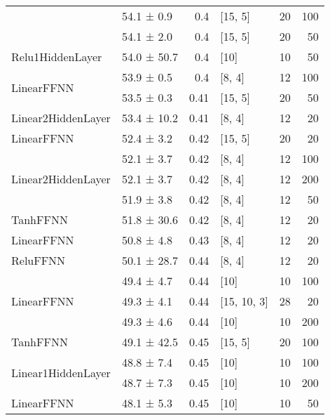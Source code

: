 \begin{table*}[h]
\begin{tabular}{llrlrr}
         & 54.1 ± 0.9  &  0.4  & [15, 5]        &         20 &      100 \\
         & 54.1 ± 2.0  &  0.4  & [15, 5]        &         20 &       50 \\
 \hline
Relu1HiddenLayer         & 54.0 ± 50.7 &  0.4  & [10]           &         10 &       50 \\
 \hline
\multirow{2}{*}{LinearFFNN}         & 53.9 ± 0.5  &  0.4  & [8, 4]         &         12 &      100 \\
         & 53.5 ± 0.3  &  0.41 & [15, 5]        &         20 &       50 \\
 \hline
Linear2HiddenLayer         & 53.4 ± 10.2 &  0.41 & [8, 4]         &         12 &       20 \\
 \hline
LinearFFNN         & 52.4 ± 3.2  &  0.42 & [15, 5]        &         20 &       20 \\
 \hline
\multirow{3}{*}{Linear2HiddenLayer}         & 52.1 ± 3.7  &  0.42 & [8, 4]         &         12 &      100 \\
         & 52.1 ± 3.7  &  0.42 & [8, 4]         &         12 &      200 \\
         & 51.9 ± 3.8  &  0.42 & [8, 4]         &         12 &       50 \\
 \hline
TanhFFNN         & 51.8 ± 30.6 &  0.42 & [8, 4]         &         12 &       20 \\
 \hline
LinearFFNN         & 50.8 ± 4.8  &  0.43 & [8, 4]         &         12 &       20 \\
 \hline
ReluFFNN         & 50.1 ± 28.7 &  0.44 & [8, 4]         &         12 &       20 \\
 \hline
\multirow{3}{*}{LinearFFNN}         & 49.4 ± 4.7  &  0.44 & [10]           &         10 &      100 \\
         & 49.3 ± 4.1  &  0.44 & [15, 10, 3]    &         28 &       20 \\
         & 49.3 ± 4.6  &  0.44 & [10]           &         10 &      200 \\
 \hline
TanhFFNN         & 49.1 ± 42.5 &  0.45 & [15, 5]        &         20 &      100 \\
 \hline
\multirow{2}{*}{Linear1HiddenLayer}         & 48.8 ± 7.4  &  0.45 & [10]           &         10 &      100 \\
         & 48.7 ± 7.3  &  0.45 & [10]           &         10 &      200 \\
 \hline
LinearFFNN         & 48.1 ± 5.3  &  0.45 & [10]           &         10 &       50 \\

\end{tabular}
\end{table*}
